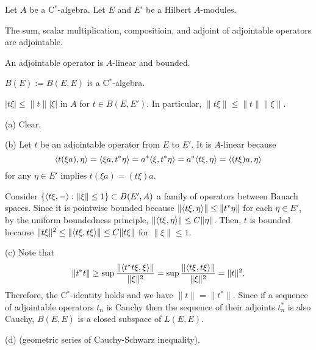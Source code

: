 \documentclass{../../../small}
\begin{document}
\begin{prop}
Let $A$ be a C$^*$-algebra.
Let $E$ and $E'$ be a Hilbert $A$-modules.
\begin{parts}
\item The sum, scalar multiplication, compositioin, and adjoint of adjointable operators are adjointable.
\item An adjointable operator is $A$-linear and bounded.
\item $B(E):=B(E,E)$ is a C$^*$-algebra.
\item $|t\xi|\le\|t\||\xi|$ in $A$ for $t\in B(E,E')$. In particular, $\|t\xi\|\le\|t\|\|\xi\|$.
\end{parts}
\end{prop}
\begin{pf}
(a)
Clear.

(b)
Let $t$ be an adjointable operator from $E$ to $E'$.
It is $A$-linear because
\[\langle t(\xi a),\eta\rangle=\langle\xi a,t^*\eta\rangle=a^*\langle\xi,t^*\eta\rangle=a^*\langle t\xi,\eta\rangle=\langle(t\xi)a,\eta\rangle\]
for any $\eta\in E'$ implies $t(\xi a)=(t\xi)a$.

Consider $\{\langle t\xi,-\rangle:\|\xi\|\le1\}\subset B(E', A)$ a family of operators between Banach spaces.
Since it is pointwise bounded because $\|\langle t\xi,\eta\rangle\|\le\|t^*\eta\|$ for each $\eta\in E'$, by the uniform boundedness principle, $\|\langle t\xi,\eta\rangle\|\le C\|\eta\|$.
Then, $t$ is bounded because $\|t\xi\|^2\le\|\langle t\xi,t\xi\rangle\|\le C\|t\xi\|$ for $\|\xi\|\le1$.

(c)
Note that
\[\|t^*t\|\ge\sup\frac{\|\langle t^*t\xi,\xi\rangle\|}{\|\xi\|^2}=\sup\frac{\|\langle t\xi,t\xi\rangle\|}{\|\xi\|^2}=\|t\|^2.\]
Therefore, the C$^*$-identity holds and we have $\|t\|=\|t^*\|$.
Since if a sequence of adjointable operators $t_n$ is Cauchy then the sequence of their adjoints $t_n^*$ is also Cauchy, $B(E,E)$ is a closed subspace of $L(E,E)$.

(d) (geometric series of Cauchy-Schwarz inequality).
\end{pf}
\end{document}
